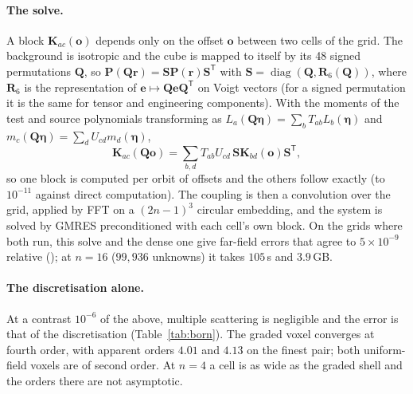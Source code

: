 \documentclass[11pt,a4paper]{article}
\newcommand{\bK}{\mathbf{K}}
\newcommand{\bP}{\mathbf{P}}
\begin{document}
\paragraph{The solve.} A block $\bK_{ac}(\mathbf{o})$ depends only on the offset $\mathbf{o}$ between two
cells of the grid. The background is isotropic and the cube is mapped to itself by its 48 signed
permutations $\mathbf{Q}$, so $\bP(\mathbf{Q}\mathbf{r})=\mathbf{S}\bP(\mathbf{r})\mathbf{S}^{\mathsf T}$ with
$\mathbf{S}=\operatorname{diag}(\mathbf{Q},\mathbf{R}_6(\mathbf{Q}))$, where $\mathbf{R}_6$ is the
representation of $\mathbf{e}\mapsto\mathbf{Q}\mathbf{e}\mathbf{Q}^{\mathsf T}$ on Voigt vectors (for a
signed permutation it is the same for tensor and engineering components). With the moments of the test
and source polynomials transforming as $L_a(\mathbf{Q}\boldsymbol\eta)=\sum_bT_{ab}L_b(\boldsymbol\eta)$ and
$m_c(\mathbf{Q}\boldsymbol\eta)=\sum_dU_{cd}m_d(\boldsymbol\eta)$,
\begin{equation}
\bK_{ac}(\mathbf{Q}\mathbf{o})=\sum_{b,d}T_{ab}U_{cd}\,\mathbf{S}\bK_{bd}(\mathbf{o})\mathbf{S}^{\mathsf T},
\end{equation}
so one block is computed per orbit of offsets and the others follow exactly (to $10^{-11}$ against direct
computation). The coupling is then a convolution over the grid, applied by FFT on a $(2n-1)^3$ circular
embedding, and the system is solved by GMRES preconditioned with each cell's own block. On the grids where
both run, this solve and the dense one give far-field errors that agree to $5\times10^{-9}$ relative
(); at $n=16$ ($99{,}936$ unknowns) it takes $105$\,s and
$3.9$\,GB.

\paragraph{The discretisation alone.} At a contrast $10^{-6}$ of the above, multiple scattering is
negligible and the error is that of the discretisation (Table~\ref{tab:born}). The graded voxel converges
at fourth order, with apparent orders $4.01$ and $4.13$ on the finest pair; both uniform-field voxels are
of second order. At $n=4$ a cell is as wide as the graded shell and the orders there are not
asymptotic.
\end{document}

